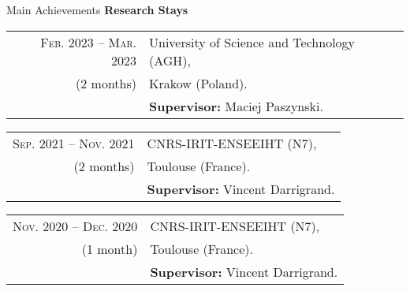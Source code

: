\begin{frame}{Main Achievements}
\textbf{Research Stays}
\vspace{0.3cm}

\begin{small}
\begin{tabular}{rl}  
\textsc{Feb.} 2023 -- \textsc{Mar.} 2023 &University of Science and Technology (AGH),  \\
(2 months)& Krakow (Poland). \\
&\textbf{Supervisor:} Maciej Paszynski.\\
\end{tabular}
\vspace{0.5cm} %

\begin{tabular}{rl}  
\textsc{Sep.} 2021 -- \textsc{Nov.} 2021&CNRS-IRIT-ENSEEIHT (N7),  \\
(2 months)& Toulouse (France). \\
&\textbf{Supervisor:} Vincent Darrigrand.\\
\end{tabular}
\vspace{0.5cm} %

\begin{tabular}{rl}  
\textsc{Nov.} 2020 -- \textsc{Dec.} 2020&CNRS-IRIT-ENSEEIHT (N7),  \\
(1 month)& Toulouse (France). \\
&\textbf{Supervisor:} Vincent Darrigrand.\\
\end{tabular}
\end{small}

\end{frame}